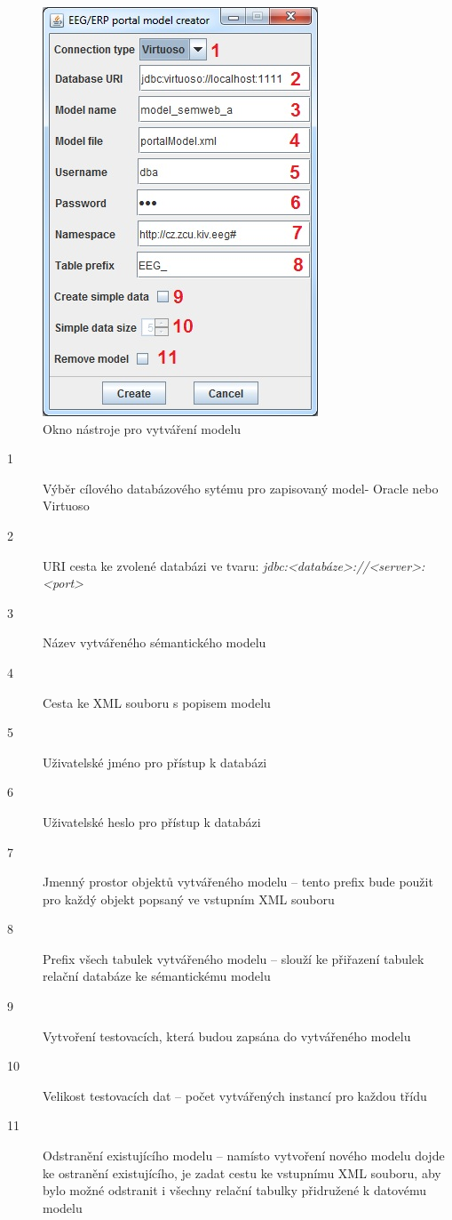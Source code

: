\documentclass{projekt}
\begin{document}
\begin{figure}[htb!]
\begin{center}
\includegraphics[scale=0.8]{manualCreator.jpg}
\caption{Okno nástroje pro vytváření modelu}
\end{center}
\end{figure}


\begin{description}
\item[1] Výběr cílového databázového sytému pro zapisovaný model- Oracle nebo 
Virtuoso
\item[2] URI cesta ke zvolené databázi ve tvaru: {\it jdbc:<databáze>://<server>:<port>}
\item[3] Název vytvářeného sémantického modelu
\item[4] Cesta ke XML souboru s popisem modelu
\item[5] Uživatelské jméno pro přístup k databázi
\item[6] Uživatelské heslo pro přístup k databázi
\item[7] Jmenný prostor objektů vytvářeného modelu – tento prefix bude použit pro každý objekt popsaný ve vstupním XML souboru
\item[8] Prefix všech tabulek vytvářeného modelu – slouží ke přiřazení tabulek relační databáze ke sémantickému modelu
\item[9] Vytvoření testovacích, která budou zapsána do vytvářeného modelu
\item[10] Velikost testovacích dat – počet vytvářených instancí pro každou třídu
\item[11] Odstranění existujícího modelu – namísto vytvoření nového modelu dojde ke ostranění existujícího, je zadat cestu ke vstupnímu XML souboru, aby bylo možné odstranit i všechny relační tabulky přidružené k datovému modelu
\end{description}
\end{document}
